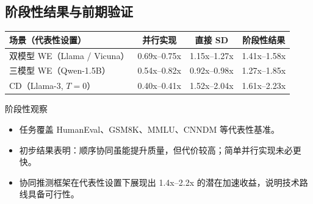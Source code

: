 \documentclass[8pt]{ctexbeamer}
\begin{document}
\subsection{阶段性结果与前期验证}
\begin{frame}{\insertsection}{\insertsubsection}
    \begin{table}
        \small
        \centering
        \renewcommand{\arraystretch}{1.25}
        \setlength{\tabcolsep}{3.2mm}
        \begin{tabular}{lccc}
            \toprule
            场景（代表性设置） & 并行实现 & 直接 SD & 阶段性结果 \\
            \midrule
            双模型 WE（Llama / Vicuna） & 0.69x--0.75x & 1.15x--1.27x & 1.41x--1.58x \\
            三模型 WE（Qwen-1.5B） & 0.54x--0.82x & 0.92x--0.98x & 1.27x--1.85x \\
            CD（Llama-3, $T=0$） & 0.40x--0.41x & 1.52x--2.04x & 1.61x--2.23x \\
            \bottomrule
        \end{tabular}
    \end{table}

    \begin{block}{阶段性观察}
        \begin{itemize}
            \item 任务覆盖 HumanEval、GSM8K、MMLU、CNNDM 等代表性基准。
            \item 初步结果表明：顺序协同虽能提升质量，但代价较高；简单并行实现未必更快。
            \item 协同推测框架在代表性设置下展现出 1.4x--2.2x 的潜在加速收益，说明技术路线具备可行性。
        \end{itemize}
    \end{block}
\end{frame}
\end{document}

